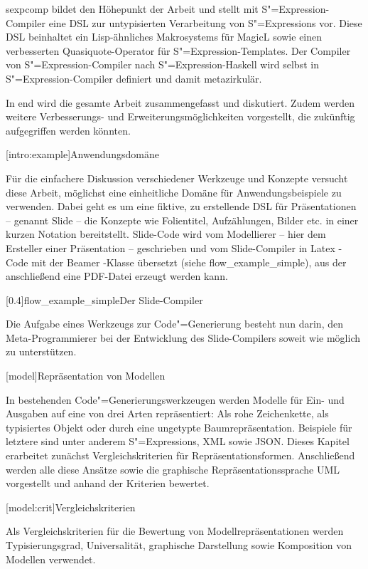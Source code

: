 \documentclass[12pt, a4paper, bibgerm]{scrbook}
\newcommand\lchapter{}
\newcommand\lsection{}
\newcommand\cref{}
\newcommand\abb{}
\newcommand\fig{}
\newcommand{\seea}[1]{(siehe \abb{#1})}
\newcommand{\sexp}{S"=Expression}
\newcommand{\sexps}{S"=Expressions}
\newcommand{\cgen}{Code"=Generierung}
\begin{document}
\cref{sexpcomp} bildet den Höhepunkt der Arbeit und stellt mit
\sexp{}-Compiler eine DSL zur untypisierten Verarbeitung von \sexps{}
vor. Diese DSL beinhaltet ein Lisp-ähnliches Makrosystems für MagicL
sowie einen verbesserten Quasiquote-Operator für \sexp{}-Templates. Der
Compiler von \sexp{}-Compiler nach \sexp{}-Haskell wird selbst in
\sexp{}-Compiler definiert und damit metazirkulär.

In \cref{end} wird die gesamte Arbeit zusammengefasst und
diskutiert. Zudem werden weitere Verbesserungs- und
Erweiterungsmöglichkeiten vorgestellt, die zukünftig aufgegriffen werden
könnten.

\lsection[intro:example]{Anwendungsdomäne}

Für die einfachere Diskussion verschiedener Werkzeuge und Konzepte
versucht diese Arbeit, möglichst eine einheitliche Domäne für
Anwendungsbeispiele zu verwenden. Dabei geht es um eine fiktive, zu
erstellende DSL für Präsentationen -- genannt Slide -- die Konzepte wie
Folientitel, Aufzählungen, Bilder etc. in einer kurzen
Notation bereitstellt. Slide-Code wird vom Modellierer -- hier dem
Ersteller einer Präsentation -- geschrieben und vom Slide-Compiler in
Latex \cite{Latex}-Code mit der Beamer \cite{LatexBeamer}-Klasse übersetzt
\seea{flow_example_simple}, aus der anschließend eine PDF-Datei erzeugt
werden kann.

\fig[0.4]{flow_example_simple}{Der Slide-Compiler} 

Die Aufgabe eines Werkzeugs zur \cgen{} besteht nun darin, den
Meta-Programmierer bei der Entwicklung des Slide-Compilers soweit wie
möglich zu unterstützen.

\lchapter[model]{Repräsentation von Modellen}

In bestehenden \cgen{}swerkzeugen werden Modelle für Ein- und Ausgaben
auf eine von drei Arten repräsentiert: Als rohe Zeichenkette, als
typisiertes Objekt oder durch eine ungetypte
Baumrepräsentation. Beispiele für letztere sind unter anderem \sexps{},
XML sowie JSON. Dieses Kapitel erarbeitet zunächst Vergleichskriterien
für Repräsentationsformen. Anschließend werden alle diese Ansätze sowie
die graphische Repräsentationssprache UML vorgestellt und anhand der
Kriterien bewertet.

\lsection[model:crit]{Vergleichskriterien}

Als Vergleichskriterien für die Bewertung von
Modellrepräsentationen werden Typisierungsgrad, Universalität,
graphische Darstellung sowie Komposition von Modellen verwendet.
\end{document}
